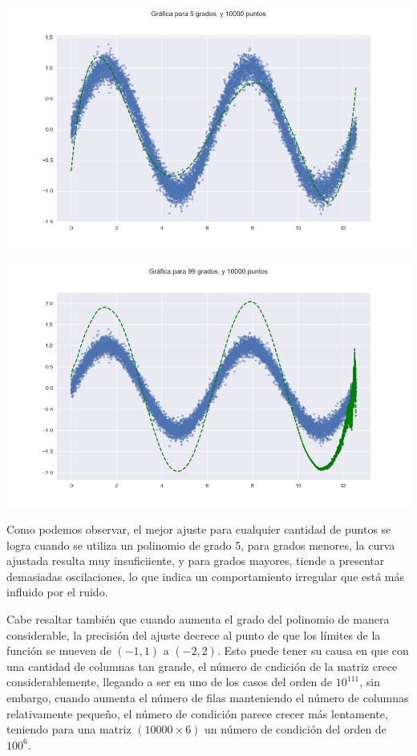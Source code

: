 \documentclass{article}
\begin{document}
\begin{enumerate}
\begin{itemize}
\begin{center}
            \includegraphics[width=\textwidth]{Ajuste510000.png}
        
            \includegraphics[width=\textwidth]{Ajuste9910000.png}
        \end{center}

        Como podemos observar, el mejor ajuste para cualquier cantidad de puntos
        se logra cuando se utiliza un polinomio de grado 5, para grados menores, la 
        curva ajustada resulta muy insuficiiente, y para grados mayores, tiende a presentar
        demasiadas oscilaciones, lo que indica un comportamiento irregular que está 
        más influido por el ruido.

        Cabe resaltar también que cuando aumenta el grado del polinomio de manera 
        considerable, la precisión del ajuste decrece al punto de que los límites de la función
        se mueven de $(-1,1)$ a $(-2,2)$. Esto puede tener su causa en que con una cantidad de
        columnas tan grande, el número de cndición de la matriz crece considerablemente, llegando
        a ser en uno de los casos del orden de $10^{111}$, sin embargo, cuando aumenta el número de
        filas manteniendo el número de columnas relativamente pequeño, el número de condición parece
        crecer más lentamente, teniendo para una matriz $(10000\times 6)$ un número de condición del
        orden de $100^6$.


\end{itemize}
\end{enumerate}
\end{document}
